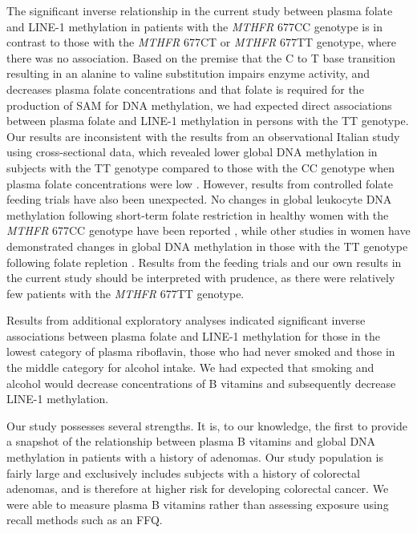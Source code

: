 \noindent The significant inverse relationship in the current study between plasma folate and LINE-1 methylation in patients with the \emph{MTHFR} 677CC genotype is in contrast to those with the \emph{MTHFR} 677CT or \emph{MTHFR} 677TT genotype, where there was no association. Based on the premise that the C to T base transition resulting in an alanine to valine substitution impairs enzyme activity, and decreases plasma folate concentrations \cite{c523,c556} and that folate is required for the production of SAM for DNA methylation, we had expected direct associations between plasma folate and LINE-1 methylation in persons with the TT genotype. Our results are inconsistent with the results from an observational Italian study using cross-sectional data, which revealed lower global DNA methylation in subjects with the TT genotype compared to those with the CC genotype when plasma folate concentrations were low \cite{c557}. However, results from controlled folate feeding trials have also been unexpected. No changes in global leukocyte DNA methylation following short-term folate restriction in healthy women with the \emph{MTHFR} 677CC genotype have been reported \cite{c528}, while other studies in women have demonstrated changes in global DNA methylation in those with the TT genotype following folate repletion \cite{c558,c559}. Results from the feeding trials and our own results in the current study should be interpreted with prudence, as there were relatively few patients with the \emph{MTHFR} 677TT genotype.

\noindent Results from additional exploratory analyses indicated significant inverse associations between plasma folate and LINE-1 methylation for those in the lowest category of plasma riboflavin, those who had never smoked and those in the middle category for alcohol intake. We had expected that smoking and alcohol would decrease concentrations of B vitamins and subsequently decrease LINE-1 methylation.

\noindent Our study possesses several strengths. It is, to our knowledge, the first to provide a snapshot of the relationship between plasma B vitamins and global DNA methylation in patients with a history of adenomas. Our study population is fairly large and exclusively includes subjects with a history of colorectal adenomas, and is therefore at higher risk for developing colorectal cancer. We were able to measure plasma B vitamins rather than assessing exposure using recall methods such as an FFQ.

